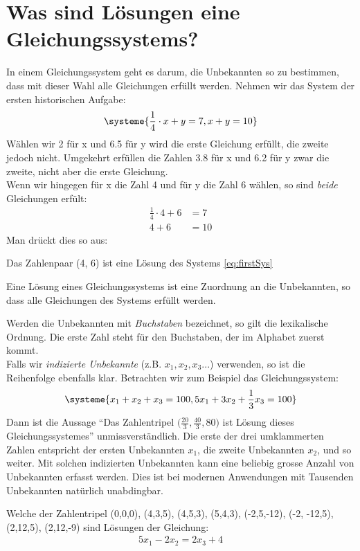 \documentclass[11pt,oneside]{article}
\begin{document}
\section{Was sind Lösungen eine Gleichungssystems?}
In einem Gleichungssystem geht es darum, die Unbekannten so zu bestimmen, dass mit dieser Wahl alle Gleichungen erfüllt werden. Nehmen wir das System der ersten historischen Aufgabe:
\begin{equation}
	\label{eq:firstSys}
	\systeme{\frac{1}{4}\cdot x+y=7, x+y=10}
\end{equation}
Wählen wir 2 für x und 6.5 für y wird die erste Gleichung erfüllt, die zweite jedoch nicht. Umgekehrt erfüllen die Zahlen 3.8 für x und 6.2 für y zwar die zweite, nicht aber die erste Gleichung.\\
Wenn wir hingegen für x die Zahl 4 und für y die Zahl 6 wählen, so sind \emph{beide} Gleichungen erfült:
\begin{align*}
	\frac{1}{4}\cdot 4 +6 &= 7\\
	4+6&=10
\end{align*}
Man drückt dies so aus:
\begin{center}\glqq Das Zahlenpaar (4, 6) ist eine Lösung des Systems \ref{eq:firstSys}\grqq\end{center}
\begin{definition}
	Eine Lösung eines Gleichungssystems ist eine Zuordnung an die Unbekannten, so dass alle Gleichungen des Systems erfüllt werden.
\end{definition}
Werden die Unbekannten mit \emph{Buchstaben} bezeichnet, so gilt die lexikalische Ordnung. Die erste Zahl steht für den Buchstaben, der im Alphabet zuerst kommt.\\
Falls wir \emph{indizierte Unbekannte} (z.B. $x_1, x_2, x_3...$) verwenden, so ist die Reihenfolge ebenfalls klar.
Betrachten wir zum Beispiel das Gleichungssystem:
\begin{equation*}
	\systeme{x_1+x_2+x_3=100, 5x_1+3x_2+\frac{1}{3}x_3=100}
\end{equation*}
Dann ist die Aussage "`Das Zahlentripel $\big(\frac{20}{3},\frac{40}{3},80\big)$ ist Lösung dieses Gleichungssystemes"' unmissverständlich. Die erste der drei umklammerten Zahlen entspricht der ersten Unbekannten $x_1$, die zweite Unbekannten $x_2$, und so weiter. Mit solchen indizierten Unbekannten kann eine beliebig grosse Anzahl von Unbekannten erfasst werden. Dies ist bei modernen Anwendungen mit Tausenden Unbekannten natürlich unabdingbar.
\begin{aufgabe}
	Welche der Zahlentripel (0,0,0), (4,3,5), (4,5,3), (5,4,3), (-2,5,-12), (-2, -12,5), (2,12,5), (2,12,-9) sind Lösungen der Gleichung:
	\begin{align*}
		5x_1-2x_2=2x_3+4
	\end{align*}
\end{aufgabe}
\end{document}
